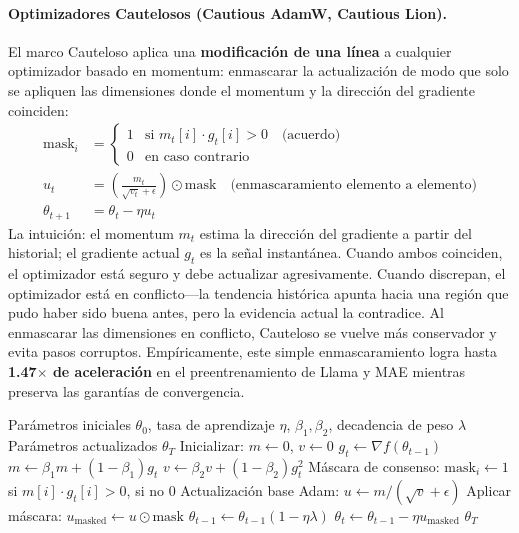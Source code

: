 \paragraph{Optimizadores Cautelosos (Cautious AdamW, Cautious Lion).}
El marco Cauteloso aplica una \textbf{modificación de una línea} a cualquier optimizador basado en momentum: enmascarar la actualización de modo que solo se apliquen las dimensiones donde el momentum y la dirección del gradiente coinciden:
\begin{align}
\text{mask}_i &= \begin{cases} 1 & \text{si } m_t[i] \cdot g_t[i] > 0 \quad\text{(acuerdo)} \\ 0 & \text{en caso contrario} \end{cases} \\
u_t &= \left(\frac{m_t}{\sqrt{v_t}+\epsilon}\right) \odot \text{mask} \quad\text{(enmascaramiento elemento a elemento)} \\
\theta_{t+1} &= \theta_t - \eta u_t
\end{align}
La intuición: el momentum $m_t$ estima la dirección del gradiente a partir del historial; el gradiente actual $g_t$ es la señal instantánea. Cuando ambos coinciden, el optimizador está seguro y debe actualizar agresivamente. Cuando discrepan, el optimizador está en conflicto---la tendencia histórica apunta hacia una región que pudo haber sido buena antes, pero la evidencia actual la contradice. Al enmascarar las dimensiones en conflicto, Cauteloso se vuelve más conservador y evita pasos corruptos. Empíricamente, este simple enmascaramiento logra hasta \textbf{1.47$\times$ de aceleración} en el preentrenamiento de Llama y MAE mientras preserva las garantías de convergencia.

\begin{algorithm}[H]
\caption{Cautious AdamW (Enmascaramiento de Actualización por Consenso)}
\label{alg:cautious}
\begin{algorithmic}[1]
\Require Parámetros iniciales $\theta_0$, tasa de aprendizaje $\eta$, $\beta_1, \beta_2$, decadencia de peso $\lambda$
\Ensure Parámetros actualizados $\theta_T$
\State Inicializar: $m \gets 0$, $v \gets 0$
    \State $g_t \gets \nabla f(\theta_{t-1})$
    \State $m \gets \beta_1 m + (1-\beta_1) g_t$
    \State $v \gets \beta_2 v + (1-\beta_2) g_t^2$
    \State Máscara de consenso: $\text{mask}_i \gets 1$ si $m[i] \cdot g_t[i] > 0$, si no $0$ 
    \State Actualización base Adam: $u \gets m / (\sqrt{v} + \epsilon)$
    \State Aplicar máscara: $u_{\text{masked}} \gets u \odot \text{mask}$ 
        \State $\theta_{t-1} \gets \theta_{t-1}(1 - \eta\lambda)$
    \EndIf
    \State $\theta_t \gets \theta_{t-1} - \eta u_{\text{masked}}$
\EndFor
\Return $\theta_T$
\end{algorithmic}
\end{algorithm}


